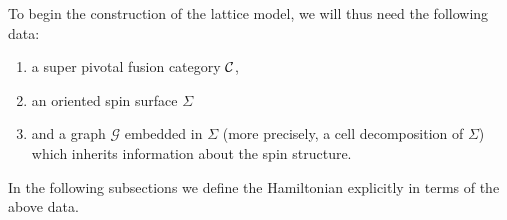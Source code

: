 \documentclass[12pt,a4paper]{article}
\newcommand{\mcg}{\mathcal{G}}
\newcommand{\kw}[1]{{\color{kwcolor}\footnotesize{(KW) #1}}}
\newcommand{\dave}[1]{{\color{ao(english)}\footnotesize{(DA) #1}}}
\newcommand{\ethan}[1]{{\color{amethyst}\footnotesize{(EL) #1}}}
\begin{document}
To begin the construction of the lattice model, we will thus need the following data:
\begin{enumerate}
\item a super pivotal fusion category ${\cal C}$,
\item an oriented spin surface $\Sigma$ 
\item and a graph $\mcg$ embedded in $\Sigma$ (more precisely, a cell decomposition of $\Sigma$) which inherits information about the spin structure.
\end{enumerate}
In the following subsections we define the Hamiltonian explicitly in terms of the above data.
\end{document}
